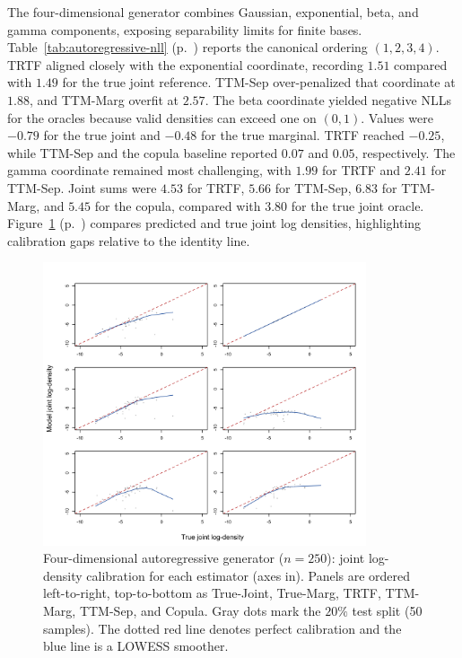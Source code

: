 \documentclass[11pt,a4paper,twoside]{book}\usepackage[]{graphicx}\usepackage[]{xcolor}
\begin{document}
The four-dimensional generator combines Gaussian, exponential, beta, and gamma components, exposing separability limits for finite bases. Table~\ref{tab:autoregressive-nll} (p.~\pageref{tab:autoregressive-nll}) reports the canonical ordering $(1,2,3,4)$. TRTF aligned closely with the exponential coordinate, recording $1.51$ compared with $1.49$ for the true joint reference. TTM-Sep over-penalized that coordinate at $1.88$, and TTM-Marg overfit at $2.57$. The beta coordinate yielded negative NLLs for the oracles because valid densities can exceed one on $(0,1)$. Values were $-0.79$ for the true joint and $-0.48$ for the true marginal. TRTF reached $-0.25$, while TTM-Sep and the copula baseline reported $0.07$ and $0.05$, respectively. The gamma coordinate remained most challenging, with $1.99$ for TRTF and $2.41$ for TTM-Sep. Joint sums were $4.53$ for TRTF, $5.66$ for TTM-Sep, $6.83$ for TTM-Marg, and $5.45$ for the copula, compared with $3.80$ for the true joint oracle. Figure~\ref{fig:autoregressive-joint-calibration} (p.~\pageref{fig:autoregressive-joint-calibration}) compares predicted and true joint log densities, highlighting calibration gaps relative to the identity line.

\begin{figure}[htbp]
 \centering
 \includegraphics[width=0.85\textwidth]{figure/logdensity_joint_N250.png}
 \caption{Four-dimensional autoregressive generator ($n=250$): joint log-density calibration for each estimator (axes in). Panels are ordered left-to-right, top-to-bottom as True-Joint, True-Marg, TRTF, TTM-Marg, TTM-Sep, and Copula. Gray dots mark the $20\%$ test split (50 samples). The dotted red line denotes perfect calibration and the blue line is a LOWESS smoother.}
 \label{fig:autoregressive-joint-calibration}
\end{figure}
\end{document}

